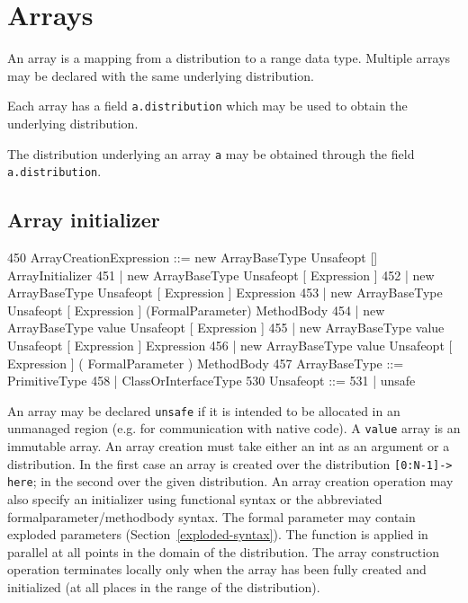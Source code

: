 \chapter{Arrays}\label{XtenArrays}

An array is a mapping from a distribution to a range data
type. Multiple arrays may be declared with the same underlying
distribution. 

Each array has a field {\tt a.distribution} which may be used to
obtain the underlying distribution.

The distribution underlying an array {\tt a} may be obtained through
the field {\tt a.distribution}.



\section{Array initializer}\label{ArrayInitializer}\label{array!creation}

\begin{x10}
450 ArrayCreationExpression ::= 
       new ArrayBaseType Unsafeopt [] 
         ArrayInitializer
451  | new ArrayBaseType Unsafeopt 
       [ Expression ]
452  | new ArrayBaseType Unsafeopt 
       [ Expression ] Expression
453  | new ArrayBaseType Unsafeopt 
       [ Expression ] 
       (FormalParameter) MethodBody
454  | new ArrayBaseType value Unsafeopt 
       [ Expression ]
455  | new ArrayBaseType value Unsafeopt 
       [ Expression ] Expression
456  | new ArrayBaseType value Unsafeopt 
       [ Expression ] 
       ( FormalParameter ) MethodBody
457 ArrayBaseType ::= PrimitiveType
458  | ClassOrInterfaceType
530 Unsafeopt ::=
531  | unsafe
\end{x10}

An array may be declared {\tt unsafe} if it is intended to be
allocated in an unmanaged region (e.g.{} for communication with native
code). A {\tt value} array is an immutable array. An array creation
must take either an int as an argument or a distribution. In the first
case an array is created over the distribution {\tt [0:N-1]-> here};
in the second over the given distribution. An array creation operation
may also specify an initializer using functional syntax or the
abbreviated formalparameter/methodbody syntax. The formal parameter
may contain exploded parameters
(Section~\ref{exploded-syntax}). The function is applied in
parallel at all points in the domain of the distribution. The array
construction operation terminates locally only when the array has been
fully created and initialized (at all places in the range of the
distribution).

